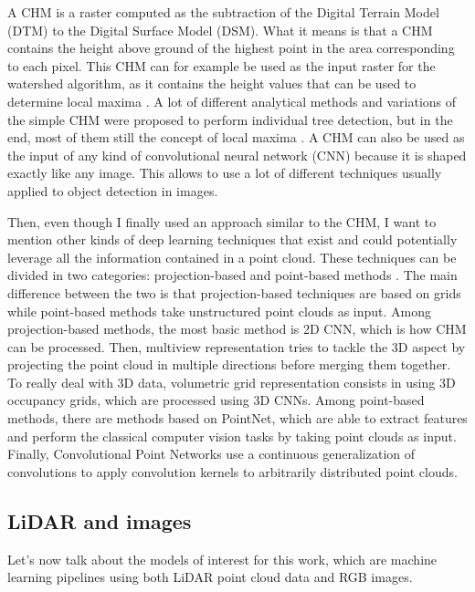 \documentclass[
]{report}
\begin{document}
A CHM is a raster computed as the subtraction of the Digital Terrain
Model (DTM) to the Digital Surface Model (DSM). What it means is that a
CHM contains the height above ground of the highest point in the area
corresponding to each pixel. This CHM can for example be used as the
input raster for the watershed algorithm, as it contains the height
values that can be used to determine local maxima
\autocite{lidar_watershed}. A lot of different analytical methods and
variations of the simple CHM were proposed to perform individual tree
detection, but in the end, most of them still the concept of local
maxima \autocite{lidar_benchmark,lidar_benchmark_2}. A CHM can also be
used as the input of any kind of convolutional neural network (CNN)
because it is shaped exactly like any image. This allows to use a lot of
different techniques usually applied to object detection in images.

Then, even though I finally used an approach similar to the CHM, I want
to mention other kinds of deep learning techniques that exist and could
potentially leverage all the information contained in a point cloud.
These techniques can be divided in two categories: projection-based and
point-based methods \autocite{lidar_classification}. The main difference
between the two is that projection-based techniques are based on grids
while point-based methods take unstructured point clouds as input. Among
projection-based methods, the most basic method is 2D CNN, which is how
CHM can be processed. Then, multiview representation tries to tackle the
3D aspect by projecting the point cloud in multiple directions before
merging them together. To really deal with 3D data, volumetric grid
representation consists in using 3D occupancy grids, which are processed
using 3D CNNs. Among point-based methods, there are methods based on
PointNet, which are able to extract features and perform the classical
computer vision tasks by taking point clouds as input. Finally,
Convolutional Point Networks use a continuous generalization of
convolutions to apply convolution kernels to arbitrarily distributed
point clouds.

\subsection{LiDAR and images}\label{lidar-and-images}

Let's now talk about the models of interest for this work, which are
machine learning pipelines using both LiDAR point cloud data and RGB
images.
\end{document}
